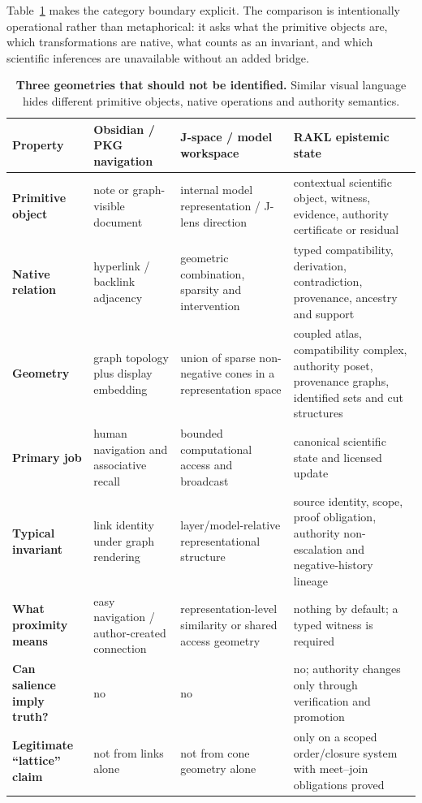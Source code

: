 Table~\ref{tab:three-geometries} makes the category boundary explicit. The comparison is intentionally operational rather than metaphorical: it asks what the primitive objects are, which transformations are native, what counts as an invariant, and which scientific inferences are unavailable without an added bridge.

\begin{table}[t]
\centering
\small
\caption{\textbf{Three geometries that should not be identified.} Similar visual language hides different primitive objects, native operations and authority semantics.}
\label{tab:three-geometries}
\begin{tabularx}{\textwidth}{>{\bfseries}p{}XXX}
\toprule
Property & Obsidian / PKG navigation & J-space / model workspace & RAKL epistemic state \\
\midrule
Primitive object & note or graph-visible document & internal model representation / J-lens direction & contextual scientific object, witness, evidence, authority certificate or residual \\
Native relation & hyperlink / backlink adjacency & geometric combination, sparsity and intervention & typed compatibility, derivation, contradiction, provenance, ancestry and support \\
Geometry & graph topology plus display embedding & union of sparse non-negative cones in a representation space & coupled atlas, compatibility complex, authority poset, provenance graphs, identified sets and cut structures \\
Primary job & human navigation and associative recall & bounded computational access and broadcast & canonical scientific state and licensed update \\
Typical invariant & link identity under graph rendering & layer/model-relative representational structure & source identity, scope, proof obligation, authority non-escalation and negative-history lineage \\
What proximity means & easy navigation / author-created connection & representation-level similarity or shared access geometry & nothing by default; a typed witness is required \\
Can salience imply truth? & no & no & no; authority changes only through verification and promotion \\
Legitimate ``lattice'' claim & not from links alone & not from cone geometry alone & only on a scoped order/closure system with meet--join obligations proved \\
\bottomrule
\end{tabularx}
\end{table}


